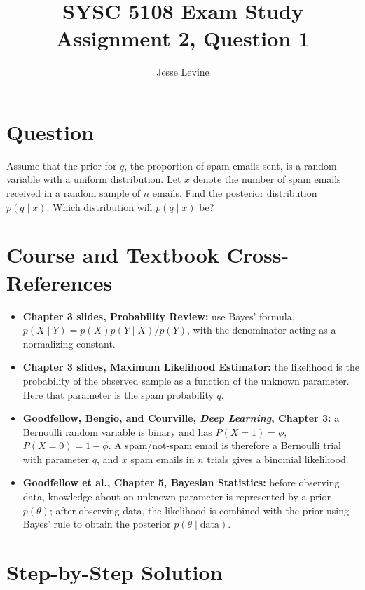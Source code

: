 \documentclass[11pt]{article}
\title{SYSC 5108 Exam Study\\Assignment 2, Question 1}
\author{Jesse Levine}
\date{}
\begin{document}
\maketitle

\section*{Question}

Assume that the prior for \(q\), the proportion of spam emails sent, is a random
variable with a uniform distribution. Let \(x\) denote the number of spam emails
received in a random sample of \(n\) emails. Find the posterior distribution
\(p(q \mid x)\). Which distribution will \(p(q \mid x)\) be?

\section*{Course and Textbook Cross-References}

\begin{itemize}
    \item \textbf{Chapter 3 slides, Probability Review:} use Bayes' formula,
    \(p(X \mid Y) = p(X)p(Y \mid X)/p(Y)\), with the denominator acting as a
    normalizing constant.
    \item \textbf{Chapter 3 slides, Maximum Likelihood Estimator:} the likelihood
    is the probability of the observed sample as a function of the unknown
    parameter. Here that parameter is the spam probability \(q\).
    \item \textbf{Goodfellow, Bengio, and Courville, \emph{Deep Learning},
    Chapter 3:} a Bernoulli random variable is binary and has
    \(P(X=1)=\phi\), \(P(X=0)=1-\phi\). A spam/not-spam email is therefore a
    Bernoulli trial with parameter \(q\), and \(x\) spam emails in \(n\) trials
    gives a binomial likelihood.
    \item \textbf{Goodfellow et al., Chapter 5, Bayesian Statistics:} before
    observing data, knowledge about an unknown parameter is represented by a
    prior \(p(\theta)\); after observing data, the likelihood is combined with
    the prior using Bayes' rule to obtain the posterior \(p(\theta \mid \text{data})\).
\end{itemize}

\section*{Step-by-Step Solution}
\end{document}

